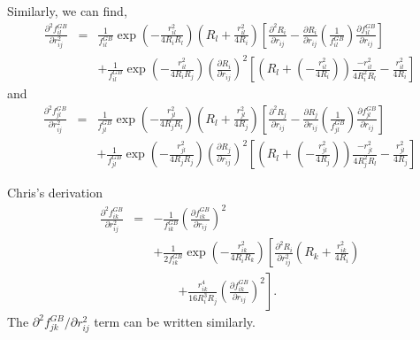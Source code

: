 \documentclass[12pt]{article}
\begin{document}
Similarly, we can find, 
\begin{eqnarray}
\label{eq:fGBil2ndderv1}
\frac{\partial^{2} f_{il}^{GB}}{\partial r_{ij}^{2}} & = & 
\frac{1}{f_{il}^{GB}}\exp(-\frac{r_{il}^2}{4R_{i}R_{l}})(R_{l} + \frac{r_{il}^{2}}{4R_{i}})\left[ \frac{\partial^{2} R_{i}}{\partial r_{ij}} - \frac{\partial R_{i}}{\partial r_{ij}}\left(\frac{1}{f_{il}^{GB}}\right) \frac{\partial f_{il}^{GB}}{\partial r_{ij}}\right] \\ \nonumber
& & + \frac{1}{f_{il}^{GB}}\exp(-\frac{r_{il}^2}{4R_{i}R_{j}})\left(\frac{\partial R_{i}}{\partial r_{ij}}\right)^{2}
\left[(R_{l} + \left(-\frac{r_{il}^{2}}{4R_{i}}\right))\frac{-r_{il}^{2}}{4R_{i}^{2}R_{l}} - \frac{r_{il}^{2}}{4R_{i}} \right]
\end{eqnarray}
and
\begin{eqnarray}
\label{eq:fGBjl2ndderv1}
\frac{\partial^{2} f_{jl}^{GB}}{\partial r_{ij}^{2}} & = & 
\frac{1}{f_{jl}^{GB}}\exp(-\frac{r_{jl}^2}{4R_{j}R_{l}})(R_{l} + \frac{r_{jl}^{2}}{4R_{j}})\left[ \frac{\partial^{2} R_{j}}{\partial r_{ij}} - \frac{\partial R_{j}}{\partial r_{ij}}\left(\frac{1}{f_{jl}^{GB}}\right) \frac{\partial f_{jl}^{GB}}{\partial r_{ij}}\right] \\ \nonumber
& & + \frac{1}{f_{jl}^{GB}}\exp(-\frac{r_{jl}^2}{4R_{j}R_{j}})\left(\frac{\partial R_{j}}{\partial r_{ij}}\right)^{2}
\left[(R_{l} + \left(-\frac{r_{jl}^{2}}{4R_{j}}\right))\frac{-r_{jl}^{2}}{4R_{j}^{2}R_{l}} - \frac{r_{jl}^{2}}{4R_{j}} \right]
\end{eqnarray}

Chris's derivation
\begin{eqnarray}
\label{eq:fGBil2ndderv2}
\frac{\partial^{2} f_{ik}^{GB}}{\partial r_{ij}^{2}} & = & 
-\frac{1}{ f_{ik}^{GB}}\left(\frac{\partial f_{ik}^{GB}}{\partial r_{ij}}\right)^{2}  \nonumber \\
&& + \frac{1}{ 2f_{ik}^{GB}}  \exp\left(-\frac{r_{ik}^2}{4R_{i}R_{k}}\right) \left[
\frac{\partial^{2} R_{i}}{\partial r_{ij}^2}\left(R_k +\frac{r_{ik}^2}{4R_i}  \right) \right. \nonumber \\
&& \qquad \left. + \frac{r_{ik}^4}{16R_i^3R_j}\left(\frac{\partial f_{ik}^{GB}}{\partial r_{ij}}\right)^{2}\right].
\end{eqnarray}
The $\partial^{2} f_{jk}^{GB}/\partial r_{ij}^{2}$ term can be written similarly.
\end{document}
